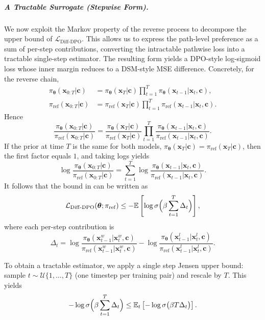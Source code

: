 \subparagraph{A Tractable Surrogate (Stepwise Form).} We now exploit the Markov property of the reverse process to decompose the upper bound of $\mathcal L_{\mathrm{Diff\text{-}DPO}}$. This allows us to express the path-level preference as a sum of per-step contributions, converting the intractable pathwise loss into a tractable single-step estimator. The resulting form yields a DPO-style log-sigmoid loss whose inner margin reduces to a DSM-style MSE difference. Concretely, for the reverse chain,
\begin{align*}
    \pi_{\bm\theta}(\mathbf x_{0:T}| \mathbf c)
&=\pi_{\bm\theta}(\mathbf x_T| \mathbf c) \prod_{t=1}^{T}
\pi_{\bm\theta}(\mathbf x_{t-1}| \mathbf x_t,\mathbf c),
\\
\pi_{\mathrm{ref}}(\mathbf x_{0:T}| \mathbf c)
&=\pi_{\mathrm{ref}}(\mathbf x_T| \mathbf c) \prod_{t=1}^{T}
\pi_{\mathrm{ref}}(\mathbf x_{t-1}| \mathbf x_t,\mathbf c).
\end{align*}
Hence
\[
\frac{\pi_{\bm\theta}(\mathbf x_{0:T}| \mathbf c)}{\pi_{\mathrm{ref}}(\mathbf x_{0:T}| \mathbf c)}
=
\frac{\pi_{\bm\theta}(\mathbf x_T| \mathbf c)}{\pi_{\mathrm{ref}}(\mathbf x_T| \mathbf c)}
\prod_{t=1}^{T}
\frac{\pi_{\bm\theta}(\mathbf x_{t-1}| \mathbf x_t,\mathbf c)}
     {\pi_{\mathrm{ref}}(\mathbf x_{t-1}| \mathbf x_t,\mathbf c)}.
\]
If the prior at time $T$ is the same for both models,
$\pi_{\bm\theta}(\mathbf x_T| \mathbf c)=\pi_{\mathrm{ref}}(\mathbf x_T| \mathbf c)$,
then the first factor equals $1$, and taking logs yields
\[
\log\frac{\pi_{\bm\theta}(\mathbf x_{0:T}| \mathbf c)}{\pi_{\mathrm{ref}}(\mathbf x_{0:T}| \mathbf c)}
=\sum_{t=1}^{T}
\log\frac{\pi_{\bm\theta}(\mathbf x_{t-1}| \mathbf x_t,\mathbf c)}
         {\pi_{\mathrm{ref}}(\mathbf x_{t-1}| \mathbf x_t,\mathbf c)}.
\]
It follows that the bound in  can be written as
\[
\mathcal L_{\mathrm{Diff\text{-}DPO}}(\bm\theta;\pi_{\mathrm{ref}})
  \le  - \mathbb{E} \left[\log\sigma \Big(\beta \sum_{t=1}^T \Delta_t\Big)\right],
\]
where each per-step contribution is
\[
\Delta_t
= \log\frac{\pi_{\bm\theta}(\mathbf x^w_{t-1}|\mathbf x^w_t,\mathbf c)}
               {\pi_{\mathrm{ref}}(\mathbf x^w_{t-1}|\mathbf x^w_t,\mathbf c)}
- \log\frac{\pi_{\bm\theta}(\mathbf x^l_{t-1}|\mathbf x^l_t,\mathbf c)}
               {\pi_{\mathrm{ref}}(\mathbf x^l_{t-1}|\mathbf x^l_t,\mathbf c)}.
\]

To obtain a tractable estimator, we apply a single step Jensen upper bound: sample
$t\sim\mathcal U\{1,\dots,T\}$ (one timestep per training pair) and rescale by $T$. This yields
\[
-\log\sigma \Big(\beta \sum_{t=1}^T \Delta_t\Big)
 \le  \mathbb{E}_{t} \left[-\log\sigma \big(\beta T \Delta_t\big)\right].
\]

